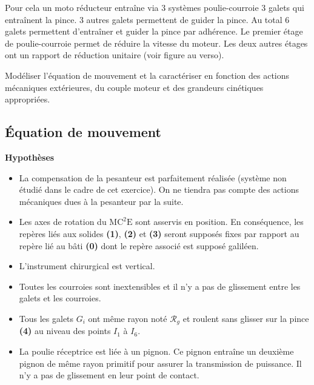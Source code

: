 \documentclass[10pt,fleqn]{article} %
\begin{document}
\begin{multicols}{2}
Pour cela un moto réducteur entraîne via 3 systèmes poulie-courroie 3 galets qui entraînent la pince. 3 autres galets permettent de guider la pince. Au total 6 galets permettent d'entraîner et guider la pince par adhérence. Le premier étage de poulie-courroie permet de réduire la vitesse du moteur. Les deux autres étages ont un rapport de réduction unitaire (voir figure au verso). 
\fi



\begin{obj}
Modéliser l’équation de mouvement et la caractériser en fonction des actions mécaniques extérieures, du couple moteur et des grandeurs cinétiques appropriées.
\end{obj}




\subsection*{Équation de mouvement}



\textbf{Hypothèses}
\begin{itemize}
\item La compensation de la pesanteur est parfaitement réalisée (système non étudié dans le cadre de cet exercice). On ne tiendra pas compte des actions mécaniques dues à la pesanteur par la suite.
\item Les axes de rotation du $\text{MC}^2\text{E}$ sont asservis en position. En conséquence, les repères liés aux solides \textbf{(1)}, \textbf{(2)} et \textbf{(3)} seront supposés fixes par rapport au repère lié au bâti \textbf{(0)} dont le repère associé est supposé galiléen.
\item L’instrument chirurgical est vertical.
\item Toutes les courroies sont inextensibles et il n’y a pas de glissement entre les galets et les courroies.
\item Tous les galets $G_i$ ont même rayon noté $\mathcal{R}_g$ et roulent sans glisser sur la pince \textbf{(4)} au niveau des points $I_1$ à $I_6$.
\item La poulie réceptrice est liée à un pignon. Ce pignon entraîne un deuxième pignon de même rayon primitif pour assurer la transmission de puissance. Il n’y a pas de glissement en leur point de contact.
\end{itemize}


\end{multicols}
\end{document}
